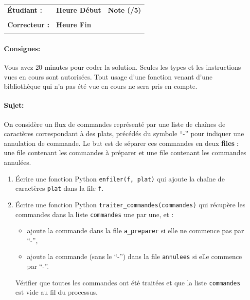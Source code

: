 \documentclass[a4paper,11pt]{article}
\begin{document}
\vspace{-0.3 cm}

\begin{table}[h!]
\centering
\renewcommand{\arraystretch}{1.4} %
\begin{tabular}{|p{10cm}|p{3cm}|p{2cm}|}
\hline
\textbf{Étudiant :} & \textbf{Heure Début }  & \textbf{Note (/5) }  \\
& & \\
\hline
\textbf{Correcteur :} & \textbf{Heure Fin } & \\
& & \\
\hline

\hline
\end{tabular}
\end{table}
\vspace{-0.4 cm}
\paragraph*{Consignes:} Vous avez 20 minutes pour coder la solution. Seules les types et les instructions vues en cours sont autorisées. Tout usage d'une fonction 
venant d'une bibliothèque qui n'a pas été vue en cours ne sera pris en compte. 

\vspace{-0.2 cm}
\paragraph*{Sujet:}


On considère un flux de commandes représenté par une liste de chaînes de caractères correspondant à des plats, précédés du symbole ``-'' pour indiquer une annulation de commande.  
Le but est de séparer ces commandes en deux \textbf{files} : une file contenant les commandes à préparer et une file contenant les commandes annulées.


\begin{enumerate}
    \item Écrire une fonction Python \texttt{enfiler(f, plat)} qui ajoute la chaîne de caractères  \texttt{plat} dans la file \texttt{f}.
    
    \item Écrire une fonction Python \texttt{traiter\_commandes(commandes)} qui récupère les commandes dans la liste \texttt{commandes} une par une, 
    et :
    \begin{itemize}
        \item ajoute la commande dans la file \texttt{a\_preparer} si elle ne commence pas par ``-'',
        \item ajoute la commande (sans le ``-'') dans la file \texttt{annulees} si elle commence par ``-''.
    \end{itemize}
    
    Vérifier que toutes les commandes ont été traitées et que la liste \texttt{commandes} est vide au fil du processus.
\end{enumerate}
\end{document}
